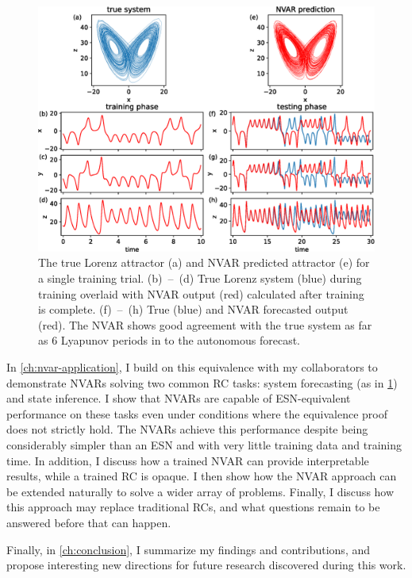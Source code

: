\begin{figure}
  \includegraphics[width=\textwidth]{figures/nvar-predict-lorenz}
  \caption{The true Lorenz attractor (a) and NVAR predicted attractor
    (e) for a single training trial. (b)~--~(d) True Lorenz system
    (blue) during training overlaid with NVAR output (red) calculated
    after training is complete. (f)~--~(h) True (blue) and NVAR
    forecasted output (red). The NVAR shows good agreement with the
    true system as far as $6$ Lyapunov periods in to the autonomous
    forecast.}
  \label{fig:intro-nvar-predict-lorenz}
\end{figure}

In \cref{ch:nvar-application}, I build on this equivalence with my
collaborators to demonstrate NVARs solving two common RC tasks: system
forecasting (as in \cref{fig:intro-nvar-predict-lorenz}) and state
inference.  I show that NVARs are capable of ESN-equivalent performance
on these tasks even under conditions where the equivalence proof does
not strictly hold. The NVARs achieve this performance despite being
considerably simpler than an ESN and with very little training data and
training time. In addition, I discuss how a trained NVAR can provide
interpretable results, while a trained RC is opaque. I then show how
the NVAR approach can be extended naturally to solve a wider array of
problems. Finally, I discuss how this approach may replace traditional
RCs, and what questions remain to be answered before that can happen.

Finally, in \cref{ch:conclusion}, I summarize my findings and
contributions, and propose interesting new directions for future
research discovered during this work.
